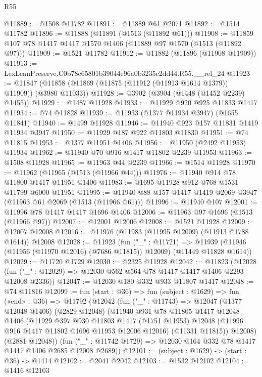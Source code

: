 \begin{lexlean}{R55}
\begin{coremodule}
{{@11889 := @1508 @11782
@11891 := @11889 @61 @2071
@11892 := @1514 @11782
@11896 := @11888 (@11891 (@1513 (@11892 @61)))
@11908 := @11859 @107 @78 @1417 @1417 @1570 @1406 (@11889 @97 @1570 (@1513 (@11892 @97)))
@11909 := @1521 @11782
@11912 := @11882 (@11896 (@11908 @11909))
@11913 := LexLeanPreserve.C0b78c65801b39044e96a0b3235c2dd44.R55.__rel_24
@11923 := @11847 (@11858 (@11869 (@11875 (@11912 (@11913 @1614 @1379)) @11909)) (@3980 @11033))
@11928 := @3902 (@3904 (@1448 (@1452 @2239) @1455))
@11929 := @1487 @11928
@11933 := @11929 @920 @925 @11833 @1417
@11934 := @74 @11828
@11939 := @11933 (@1377 @11934 @3947) (@1655 @11841)
@11940 := @1499 @11928
@11946 := @11940 @923 @157 @11831 @1419 @11934 @3947
@11950 := @11929 @187 @922 @11803 @11830
@11951 := @74 @11815
@11953 := @1377 @11951 @1406
@11956 := @11950 (@2492 @11953) @11934
@11962 := @11940 @70 @916 @1417 @11802 @2239 @11953
@11963 := @1508 @11928
@11965 := @11963 @44 @2239
@11966 := @1514 @11928
@11970 := @11962 (@11965 (@1513 (@11966 @44)))
@11976 := @11940 @914 @78 @11800 @1417 @11951 @1406
@11983 := @1695 @11928 @912 @768 @1531 @11799 @6000 @11951
@11995 := @11940 @88 @157 @1417 @1419 @2069 @3947 (@11963 @61 @2069 (@1513 (@11966 @61)))
@11996 := @11940 @107
@12001 := @11996 @78 @1417 @1417 @1696 @1406
@12006 := @11963 @97 @1696 (@1513 (@11966 @97))
@12007 := @12001 @12006
@12008 := @1521 @11928
@12009 := @12007 @12008
@12016 := @11976 (@11983 (@11995 @12009) (@11913 @1788 @1614)) @12008
@12028 := @11923
    (fun ("_" : @11721) =>
    @11939 (@11946 (@11956 (@11970 @12016) (@7686 @11815)) @12009) (@11449 @11828 @1614))
@12029 := @11720 @1729
@12030 := @2325 @11928
@12042 := @11823
    (@12028 (fun ("_" : @12029) => @12030 @562 @564 @78 @1417 @1417 @1406 @2293 @12008 @2336))
@12047 := @12030 @180 @332 @933 @11807 @1417
@12048 := @74 @11816
@12099 := fun (start : @36) =>
  fun (subject : @1629) =>
  fun («end» : @36) =>
  @11792
    (@12042
      (fun ("_" : @11743) =>
      @12047
        (@1377 @12048 @1406)
        (@2829 @12048)
        (@11940
          @931
          @78
          @11805
          @1417
          @12048
          @1406
          (@11929
            @397
            @930
            @11803
            @1417
            (@1751 @11953)
            @12048
            (@11996 @916 @1417 @11802 @1696 @11953 @12006 @12016)
            (@11331 @11815))
          @12008)
        (@2881 @12048))
      (fun ("_" : @11742 @1729) => @12030 @164 @332 @78 @1417 @1417 @1406 @2685 @12008 @2689))
@12101 := (subject : @1629) -> (start : @36) -> @1414
@12102 := @2041 @2042
@12103 := @1532 @12102
@12104 := @1416 @12103
}}
\end{coremodule}
\end{lexlean}
